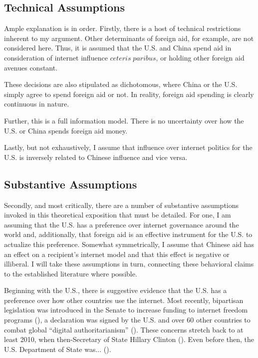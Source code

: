 \documentclass[12pt]{article}
\begin{document}
\subsection*{Technical Assumptions}
Ample explanation is in order. Firstly, there is a host of technical restrictions inherent to my argument. Other determinants of foreign aid, for example, are not considered here. Thus, it is assumed that the U.S. and China spend aid in consideration of internet influence $ceteris\;paribus$, or holding other foreign aid avenues constant. 

These decisions are also stipulated as dichotomous, where China or the U.S. simply agree to spend foreign aid or not. In reality, foreign aid spending is clearly continuous in nature.

Further, this is a full information model. There is no uncertainty over how the U.S. or China spends foreign aid money.

Lastly, but not exhaustively, I assume that influence over internet politics for the U.S. is inversely related to Chinese influence and vice versa.

\subsection*{Substantive Assumptions}
Secondly, and most critically, there are a number of substantive assumptions invoked in this theoretical exposition that must be detailed. For one, I am assuming that the U.S. has a preference over internet governance around the world and, additionally, that foreign aid is an effective instrument for the U.S. to actualize this preference. Somewhat symmetrically, I assume that Chinese aid has an effect on a recipient's internet model and that this effect is negative or illiberal. I will take these assumptions in turn, connecting these behavioral claims to the established literature where possible.

Beginning with the U.S., there is suggestive evidence that the U.S. has a preference over how other countries use the internet. Most recently, bipartisan legislation was introduced in the Senate to increase funding to internet freedom programs (\cite{government2022a}), a declaration was signed by the U.S. and over 60 other countries to combat global ``digital authoritarianism'' (\cite{government2022b}). These concerns stretch back to at least 2010, when then-Secretary of State Hillary Clinton (\cite{government2010}). Even before then, the U.S. Department of State was... (\cite{government2021a}).
\end{document}
